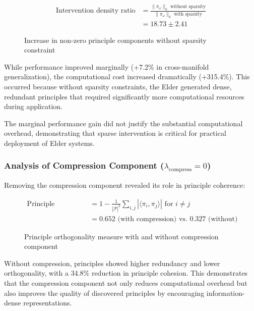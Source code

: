 \begin{figure}[h]
\centering
\begin{minipage}{0.9\textwidth}
\centering
\begin{align}
\text{Intervention density ratio} &= \frac{\|\pi_{\omega}\|_0 \text{ without sparsity}}{\|\pi_{\omega}\|_0 \text{ with sparsity}}\\
&= 18.73 \pm 2.41
\end{align}
\end{minipage}
\caption{Increase in non-zero principle components without sparsity constraint}
\end{figure}

While performance improved marginally (+7.2\% in cross-manifold generalization), the computational cost increased dramatically (+315.4\%). This occurred because without sparsity constraints, the Elder generated dense, redundant principles that required significantly more computational resources during application.

The marginal performance gain did not justify the substantial computational overhead, demonstrating that sparse intervention is critical for practical deployment of Elder systems.

\subsubsection{Analysis of Compression Component ($\lambda_{\text{compress}} = 0$)}

Removing the compression component revealed its role in principle coherence:

\begin{figure}[h]
\centering
\begin{minipage}{0.9\textwidth}
\centering
\begin{align}
\text{Principle coherence} &= 1 - \frac{1}{|\mathcal{P}|^2} \sum_{i,j} |\langle \pi_i, \pi_j \rangle| \text{ for } i \neq j\\
&= 0.652 \text{ (with compression) vs. } 0.327 \text{ (without)}
\end{align}
\end{minipage}
\caption{Principle orthogonality measure with and without compression component}
\end{figure}

Without compression, principles showed higher redundancy and lower orthogonality, with a 34.8\% reduction in principle cohesion. This demonstrates that the compression component not only reduces computational overhead but also improves the quality of discovered principles by encouraging information-dense representations.

